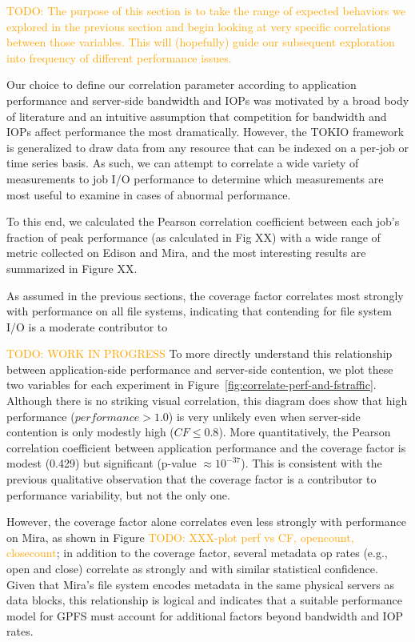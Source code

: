 \documentclass[conference,10pt,compsocconf]{IEEEtran}
\newcommand{\todo}[1]{\textcolor{Orange}{TODO: #1}}
\begin{document}
\todo{The purpose of this section is to take the range of expected behaviors we explored in the previous section and begin looking at very specific correlations between those variables.  This will (hopefully) guide our subsequent exploration into frequency of different performance issues.}

Our choice to define our correlation parameter according to application performance and server-side bandwidth and IOPs was motivated by a broad body of literature and an intuitive assumption that competition for bandwidth and IOPs affect performance the most dramatically.  However, the TOKIO framework is generalized to draw data from any resource that can be indexed on a per-job or time series basis. As such, we can attempt to correlate a wide variety of measurements to job I/O performance to determine which measurements are most useful to examine in cases of abnormal performance.

To this end, we calculated the Pearson correlation coefficient between each job's fraction of peak performance (as calculated in Fig XX) with a wide range of metric collected on Edison and Mira, and the most interesting results are summarized in Figure XX.

As assumed in the previous sections, the coverage factor correlates most strongly with performance on all file systems, indicating that contending for file system I/O is a moderate contributor to 

\hrulefill

\todo{WORK IN PROGRESS} To more directly understand this relationship between application-side
performance and server-side contention, we plot these two variables for each
experiment in Figure~\ref{fig:correlate-perf-and-fstraffic}.  Although there is
no striking visual correlation, this diagram does show that high performance
($performance > 1.0$) is very unlikely even when server-side contention is only
modestly high ($CF \leq 0.8$).  More quantitatively, the Pearson correlation
coefficient between application performance and the coverage factor is modest
(0.429) but significant (p-value $\approx 10^{-37}$).  This is consistent with
the previous qualitative observation that the coverage factor is a contributor
to performance variability, but not the only one.

However, the
coverage factor alone correlates even less strongly with performance on Mira,
as shown in Figure \todo{XXX-plot perf vs CF, opencount, closecount}; in
addition to the coverage factor, several metadata op rates (e.g., open and
close) correlate as strongly and with similar statistical confidence.  Given
that Mira's file system encodes metadata in the same physical servers as data
blocks, this relationship is logical and indicates that a suitable performance
model for GPFS must account for additional factors beyond bandwidth and IOP
rates.
\end{document}
